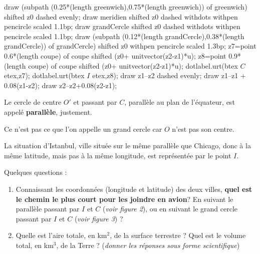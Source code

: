 \begin{changemargin}{-5mm}{-10mm}
\begin{exemple*1}
\begin{minipage}{0.35\linewidth}
\begin{center}
{\begin{Geometrie}
                    draw (subpath (0.25*(length greenwich),0.75*(length greenwich)) of greenwich) shifted z0 dashed evenly;                    
                    draw meridien shifted z0 dashed withdots withpen pencircle scaled 1.1bp;
                    draw grandCercle shifted z0 dashed withdots withpen pencircle scaled 1.1bp;
                    draw (subpath (0.12*(length grandCercle),0.38*(length grandCercle)) of grandCercle) shifted z0 withpen pencircle scaled 1.3bp;
                    z7=point 0.6*(length coupe) of coupe shifted (z0+ unitvector(z2-z1)*u);
                    z8=point 0.9*(length coupe) of coupe shifted (z0+ unitvector(z2-z1)*u);
                    dotlabel.urt(btex $C$ etex,z7);
                    dotlabel.urt(btex $I$ etex,z8);
                    draw z1--z2 dashed evenly;
                    draw z1--z1 + 0.08(z1-z2);
                    draw z2--z2+0.08(z2-z1);
                \end{Geometrie}
                }
        \end{center}
    \end{minipage}
    \hfill
    \begin{minipage}{0.65\linewidth}
        Le cercle de centre $O'$ et passant par $C$, parallèle au plan de l'équateur, est appelé  \textbf{parallèle}, justement.

        Ce n'est pas ce que l'on appelle un grand cercle car $O$ n'est pas son centre.

        La situation d'Istanbul, ville située sur le même parallèle que Chicago, donc à la même latitude, mais pas à la même longitude, est représentée par le point $I$.
        
        Quelques questions :
        \begin{enumerate}
            \item Connaissant les coordonnées (longitude et latitude) des deux villes, \textbf{quel est le chemin le plus court pour les joindre en avion}?
            En suivant le parallèle passant par $I$ et $C$ (\textit{voir figure 2}), ou en suivant le grand cercle passant par $I$ et $C$ (\textit{voir figure 3}) ?
            \item Quelle est l'aire totale, en km$^2$, de la surface terrestre ? Quel est le volume total, en km$^3$, de la Terre ? (\textit{donner les réponses sous forme scientifique})
        \end{enumerate}
    \end{minipage}
\end{exemple*1}


\end{changemargin}
